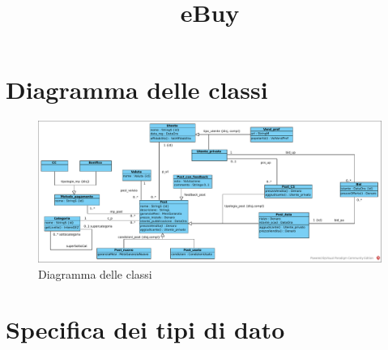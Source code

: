 \documentclass{article}
\title{eBuy}
\author{}
\date{}
\begin{document}
\maketitle

\tableofcontents

\newpage

\section{\label{sec:DiagrammaDelleClassi}Diagramma delle classi}
\begin{figure}[h]
    \centering
    \includegraphics[width=1\textwidth]{../Diagrammi/diagramma delle classi.pdf}
    \caption{Diagramma delle classi}
\end{figure}

\newpage
\section{\label{Sec:SpecificaTipoDiDato}Specifica dei tipi di dato}
\end{document}
